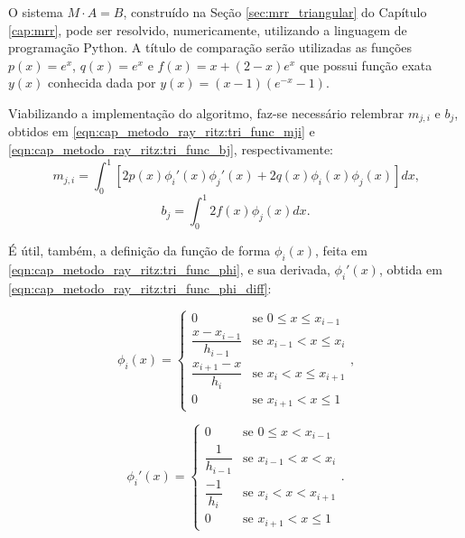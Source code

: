 \documentclass[
	12pt,				%
	openright,			%
    twoside,			%
	a4paper,			%
	english,			%
	french,				%
	spanish,			%
	brazil				%
	]{abntex2}
\numberwithin{lema}{chapter}
\numberwithin{teorema}{chapter}
\numberwithin{definicao}{chapter}
\numberwithin{exemplo}{chapter}
\numberwithin{figure}{chapter}
\begin{document}
O sistema $M\cdot A=B$, construído na Seção \ref{sec:mrr_triangular} do Capítulo \ref{cap:mrr}, pode ser resolvido, numericamente, utilizando a linguagem de programação Python. A título de comparação serão utilizadas as funções $p(x)=e^x$, $q(x)=e^x$ e $f(x)=x+(2-x)e^x$ que possui função exata $y(x)$ conhecida dada por $y(x)=(x-1)(e^{-x}-1)$.

Viabilizando a implementação do algoritmo, faz-se necessário relembrar $m_{j,i}$ e $b_j$, obtidos em \eqref{eqn:cap_metodo_ray_ritz:tri_func_mji} e \eqref{eqn:cap_metodo_ray_ritz:tri_func_bj}, respectivamente:
\begin{equation}
	\label{eqn:python_tri_func_mji}
	m_{j,i}=\int_{0}^{1} \left [
		2p(x)\phi_i'(x)\phi_j'(x)
		+
		2q(x)\phi_i(x)\phi_j(x)
	\right ]dx
	\text{,}
\end{equation}
\begin{equation}
	\label{eqn:python_tri_func_bj}
	b_j=\int_{0}^{1} 2f(x)\phi_j(x)dx
	\text{.}
\end{equation}

É útil, também, a definição da função de forma $\phi_i(x)$, feita em \eqref{eqn:cap_metodo_ray_ritz:tri_func_phi}, e sua derivada, $\phi_i'(x)$, obtida em \eqref{eqn:cap_metodo_ray_ritz:tri_func_phi_diff}:

\begin{equation}
	\label{eqn:python_tri_func_phi}
	\phi_i (x) = 
		\begin{cases}
			0 							& \mbox{se } 0 \leqslant x \leqslant x_{i - 1}\\
			\dfrac{x-x_{i-1}}{h_{i-1}} 	& \mbox{se } x_{i-1} < x \leqslant x_i\\
			\dfrac{x_{i+1}-x}{h_i}		& \mbox{se } x_i < x \leqslant x_{i+1}\\
			0							& \mbox{se } x_{i+1}<x\leqslant 1
		\end{cases}
	\text{,}
\end{equation}

\begin{equation}
	\label{eqn:python_tri_func_phi_diff}
	\phi_i ' (x) = 
		\begin{cases}
			0 							& \mbox{se } 0 \leqslant x < x_{i - 1}\\
			\dfrac{1}{h_{i-1}} 			& \mbox{se } x_{i-1} < x < x_i\\
			\dfrac{-1}{h_i}				& \mbox{se } x_i < x < x_{i+1}\\
			0							& \mbox{se } x_{i+1}<x\leqslant 1
		\end{cases}
	\text{.}
\end{equation}
\end{document}
